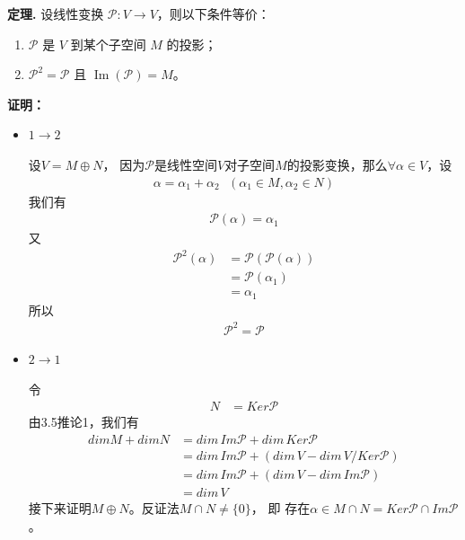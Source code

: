 \documentclass{article}
\begin{document}
\begin{zremark}
  \textbf{定理.} 设线性变换 $\mathscr{P}:V\to V$，则以下条件等价：

  \begin{enumerate}
    \item $\mathscr{P}$ 是 $V$ 到某个子空间 $M$ 的投影；
    \item $\mathscr{P}^2 = \mathscr{P}$ 且 $\operatorname{Im}(\mathscr{P}) = M$。
  \end{enumerate}\end{zremark}

\textbf{证明：}

\begin{itemize}
  \item $1 \to 2$

        设$V = M \oplus N$，
        因为$\mathscr{P}$是线性空间$V$对子空间$M$的投影变换，那么$\forall \alpha \in V$，设
        \begin{align*}
          \alpha = \alpha_1 + \alpha_2 \ \ \ (\alpha_1 \in M, \alpha_2 \in N)
        \end{align*}
        我们有
        \begin{align*}
          \mathscr{P}(\alpha) = \alpha_1
        \end{align*}
        又
        \begin{align*}
          \mathscr{P}^2(\alpha) & = \mathscr{P}(\mathscr{P}(\alpha)) \\
                                & = \mathscr{P}(\alpha_1)            \\
                                & = \alpha_1
        \end{align*}
        所以
        \begin{align*}
          \mathscr{P}^2 = \mathscr{P}
        \end{align*}

  \item $2 \to 1$

        令
        \begin{align*}
          N & = Ker\mathscr{P}
        \end{align*}
        由3.5推论1，我们有
        \begin{align*}
          dim M + dim N
           & = dim\, Im\mathscr{P} + dim\, Ker\mathscr{P}            \\
           & = dim\, Im\mathscr{P} + (dim\, V - dim\, V/Ker\mathscr{P}) \\
           & = dim\, Im\mathscr{P} + (dim\, V - dim\, Im\mathscr{P}) \\
           & = dim\, V
        \end{align*}
        接下来证明$M \oplus N$。反证法$M \cap N \neq \{0\}$， 即
        存在$\alpha \in M \cap N = Ker \mathscr{P} \cap Im \mathscr{P}$。


\end{itemize}
\end{document}
